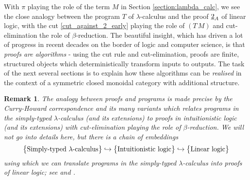 \documentclass[english,letter paper,12pt,reqno]{article}
\theoremstyle{example}
\newtheorem{remark}[theorem]{Remark}
\numberwithin{equation}{section}
\def\inta{\bold{int}}
\begin{document}
With $\pi$ playing the role of the term $M$ in Section \ref{section:lambda_calc}, we see the close analogy between the program $T$ of $\lambda$-calculus and the proof $\underline{2}_A$ of linear logic, with the cut \eqref{cut_against_2_early} playing the role of $(T \, M)$ and cut-elimination the role of $\beta$-reduction. The beautiful insight, which has driven a lot of progress in recent decades on the border of logic and computer science, is that \emph{proofs are algorithms} - using the cut rule and cut-elimination, proofs are finite, structured objects which deterministically transform inputs to outputs.
The task of the next several sections is to explain how these algorithms can be \emph{realised} in the context of a symmetric closed monoidal category with additional structure.

\begin{remark} The analogy between proofs and programs is made precise by the \emph{Curry-Howard correspondence} and its many variants \cite[\S 6.5]{selinger} which relates programs in the simply-typed $\lambda$-calculus (and its extensions) to proofs in intuitionistic logic (and its extensions) with cut-elimination playing the role of $\beta$-reduction. We will not go into details here, but there is a chain of embeddings
\[
\big\{\textup{Simply-typed $\lambda$-calculus}\big\} \hookrightarrow \big\{\textup{Intuitionistic logic}\big\} \hookrightarrow \big\{\textup{Linear logic}\big\}
\]
using which we can translate programs in the simply-typed $\lambda$-calculus into proofs of linear logic; see \cite[\S 5.1, \S 5.3]{girard_llogic} and \cite{lafont,abramsky,benton_etal}.
\end{remark}

\end{document}
